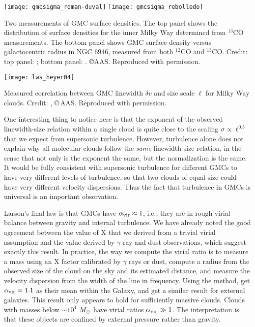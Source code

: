 \begin{marginfigure}
\hspace{0.12\linewidth}\texttt{[image: gmcsigma\_roman-duval]}
\texttt{[image: gmcsigma\_rebolledo]}
\caption[GMC surface densities]{
\label{fig:gmcsigma}
Two measurements of GMC surface densities. The top panel shows the distribution of surface densities for the inner Milky Way determined from $^{13}$CO measurements. The bottom panel shows GMC surface density versus galactocentric radius in NGC 6946, measured from both $^{12}$CO and $^{13}$CO. Credit: top panel: \citet{roman-duval10a}; bottom panel: \citet{rebolledo12a}. \copyright AAS. Reproduced with permission.
}
\end{marginfigure}

\begin{marginfigure}
\texttt{[image: lws\_heyer04]}
\caption[GMC linewidth-size relation]{
\label{fig:gmclws}
Measured correlation between GMC linewidth $\delta v$ and size scale $\ell$ for Milky Way clouds. Credit: \citet{heyer04a}, \copyright\,AAS. Reproduced with permission.
}
\end{marginfigure}

One interesting thing to notice here is that the exponent of the observed linewidth-size relation within a single cloud is quite close to the scaling $\sigma\propto \ell^{0.5}$ that we expect from supersonic turbulence. However, turbulence alone does not explain why all molecular clouds follow the {\it same} linewidth-size relation, in the sense that not only is the exponent the same, but the normalization is the same. It would be fully consistent with supersonic turbulence for different GMCs to have very different levels of turbulence, so that two clouds of equal size could have very different velocity dispersions. Thus the fact that turbulence in GMCs is universal is an important observation.

Larson's final law is that GMCs have $\alpha_{\mathrm{vir}}\approx 1$, i.e., they are in rough virial balance between gravity and internal turbulence. We have already noted the good agreement between the value of X that we derived from a trivial virial assumption and the value derived by $\gamma$ ray and dust observations, which suggest exactly this result. In practice, the way we compute the virial ratio is to measure a mass using an X factor calibrated by $\gamma$ rays or dust, compute a radius from the observed size of the cloud on the sky and its estimated distance, and measure the velocity dispersion from the width of the line in frequency. Using the method, \citet{solomon97a} get $\alpha_{\mathrm{vir}}=1.1$ as their mean within the Galaxy, and \citet{bolatto08a} get a similar result for external galaxies. This result only appears to hold for sufficiently massive clouds. Clouds with masses below $\sim 10^4$ $M_{\odot}$ have virial ratios $\alpha_{\mathrm{vir}} \gg 1$. The interpretation is that these objects are confined by external pressure rather than gravity.

